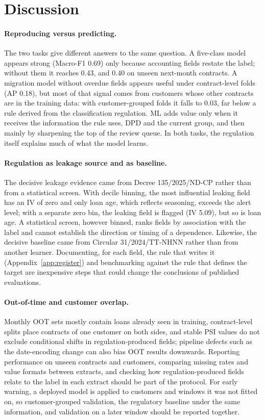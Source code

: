 \documentclass[runningheads]{llncs}
\begin{document}
\section{Discussion}
\label{sec:discussion}

\paragraph{Reproducing versus predicting.} The two tasks give different answers to the same question. A five-class model appears strong (Macro-F1 0.69) only because accounting fields restate the label; without them it reaches 0.43, and 0.40 on unseen next-month contracts. A migration model without overdue fields appears useful under contract-level folds (AP 0.18), but most of that signal comes from customers whose other contracts are in the training data: with customer-grouped folds it falls to 0.03, far below a rule derived from the classification regulation. ML adds value only when it receives the information the rule uses, DPD and the current group, and then mainly by sharpening the top of the review queue. In both tasks, the regulation itself explains much of what the model learns.

\paragraph{Regulation as leakage source and as baseline.} The decisive leakage evidence came from Decree 135/2025/ND-CP rather than from a statistical screen. With decile binning, the most influential leaking field has an IV of zero and only loan age, which reflects seasoning, exceeds the alert level; with a separate zero bin, the leaking field is flagged (IV 5.09), but so is loan age. A statistical screen, however binned, ranks fields by association with the label and cannot establish the direction or timing of a dependence. Likewise, the decisive baseline came from Circular 31/2024/TT-NHNN rather than from another learner. Documenting, for each field, the rule that writes it (Appendix~\ref{app:register}) and benchmarking against the rule that defines the target are inexpensive steps that could change the conclusions of published evaluations.

\paragraph{Out-of-time and customer overlap.} Monthly OOT sets mostly contain loans already seen in training, contract-level splits place contracts of one customer on both sides, and stable PSI values do not exclude conditional shifts in regulation-produced fields; pipeline defects such as the date-encoding change can also bias OOT results downwards. Reporting performance on unseen contracts and customers, comparing missing rates and value formats between extracts, and checking how regulation-produced fields relate to the label in each extract should be part of the protocol. For early warning, a deployed model is applied to customers and windows it was not fitted on, so customer-grouped validation, the regulatory baseline under the same information, and validation on a later window should be reported together.
\end{document}
